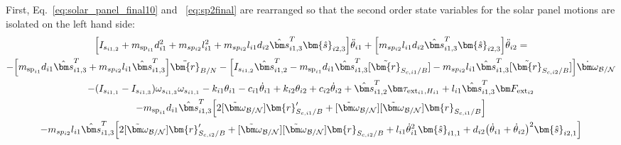 First, Eq.~\eqref{eq:solar_panel_final10} and ~\eqref{eq:sp2final} are rearranged so that the second order state variables for the solar panel motions are isolated on the left hand side:
\begin{multline}
	\Big[I_{s_{i1,2}}+ m_{\text{sp}_{i1}} d_{i1}^2 + m_{sp_{i2}} l_{i1}^2 + m_{sp_{i2}} l_{i1} d_{i2} \hat{\bm s}_{i1,3}^T \bm{\hat{s}}_{i2,3} \Big] \ddot\theta_{i1} + \Big[m_{sp_{i2}} l_{i1} d_{i2} \hat{\bm s}_{i1,3}^T \bm{\hat{s}}_{i2,3} \Big] \ddot{\theta}_{i2}=\\
	-\Big[m_{\text{sp}_{i1}} d_{i1} \hat{\bm s}_{i1,3}^T + m_{sp_{i2}} l_{i1} \hat{\bm s}_{i1,3}^T \Big] \ddot{\bm{r}}_{B/N} - \Big[I_{s_{i1,2}} \hat{\bm s}_{i1,2}^T - m_{\text{sp}_{i1}} d_{i1} \hat{\bm s}_{i1,3}^T [\tilde{\bm{r}}_{S_{c,i1}/B}] - m_{sp_{i2}} l_{i1} \hat{\bm s}_{i1,3}^T [\tilde{\bm{r}}_{S_{c,i2}/B}] \Big]\dot{\bm\omega}_{\cal B/N} \\
	- (I_{s_{i1,1}} - I_{s_{i1,3}}) \omega_{s_{i1,3}} \omega_{s_{i1,1}} - k_{i1} \theta_{i1} - c_{i1}\dot{\theta}_{i1}
	+  k_{i2} \theta_{i2} + c_{i2} \dot\theta_{i2}
	+ \hat{\bm s}_{i1,2}^T \bm \tau_{\text{ext}_{i1},H_{i1}} + l_{i1} \hat{\bm s}_{i1,3}^T \bm F_{\text{ext}_{i2}}\\
	- m_{\text{sp}_{i1}} d_{i1} \hat{\bm s}_{i1,3}^T \Big[2 [\tilde{\bm\omega}_{\cal B/N}] \bm{r}'_{S_{c,i1}/B}
	+ [\tilde{\bm\omega}_{\cal B/N}] [\tilde{\bm\omega}_{\cal B/N}] \bm{r}_{S_{c,i1}/B}\Big]
	\\
	- m_{sp_{i2}} l_{i1} \hat{\bm s}_{i1,3}^T \Big[ 2 [\tilde{\bm\omega}_{\cal B/N}] \bm{r}'_{S_{c,i2}/B}
	+ [\tilde{\bm\omega}_{\cal B/N}] [\tilde{\bm\omega}_{\cal B/N}] \bm{r}_{S_{c,i2}/B} + l_{i1} \dot{\theta}_{i1}^2 \bm{\hat{s}}_{i1,1} + d_{i2}\big(\dot{\theta}_{i1} + \dot{\theta}_{i2}\big)^2\bm{\hat{s}}_{i2,1}\Big]
	\label{eq:spMotion1}
\end{multline}

